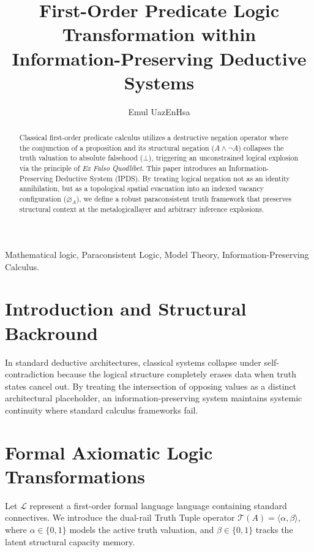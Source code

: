 \documentclass[11pt,journal,onecolumn]{IEEEtran}
\begin{document}
\title{First-Order Predicate Logic Transformation within Information-Preserving Deductive Systems}
\author{Emul UazEnHsa}
\date{\vfill}

\maketitle

\begin{abstract}
Classical first-order predicate calculus utilizes a destructive negation operator where the conjunction of a proposition and its structural negation ($A \land \neg A$) collapses the truth valuation to absolute falsehood ($\bot$), triggering an unconstrained logical explosion via the principle of \textit{Ex Falso Quodlibet}. This paper introduces an Information-Preserving Deductive System (IPDS). By treating logical negation not as an identity annihilation, but as a topological spatial evacuation into an indexed vacancy configuration ($\varnothing_A$), we define a robust paraconsistent truth framework that preserves structural context at the metalogicallayer and arbitrary inference explosions.
\end{abstract}

\begin{IEEEkeywords}
Mathematical logic, Paraconsistent Logic, Model Theory, Information-Preserving Calculus.
\end{IEEEkeywords}

\section{Introduction and Structural Backround}
In standard deductive architectures, classical systems collapse under self-contradiction because the logical structure completely erases data when truth states cancel out. By treating the intersection of opposing values as a distinct architectural placeholder, an information-preserving system maintains systemic continuity where standard calculus frameworks fail.

\section{Formal Axiomatic Logic Transformations}
Let $\mathcal{L}$ represent a first-order formal language language containing standard connectives. We introduce the dual-rail Truth Tuple operator $\mathcal{T}(A) = \langle \alpha, \beta \rangle$, where $\alpha \in \{0,1\} $ models the active truth valuation, and $\beta \in \{0,1\} $ tracks the latent structural capacity memory.
\end{document}
